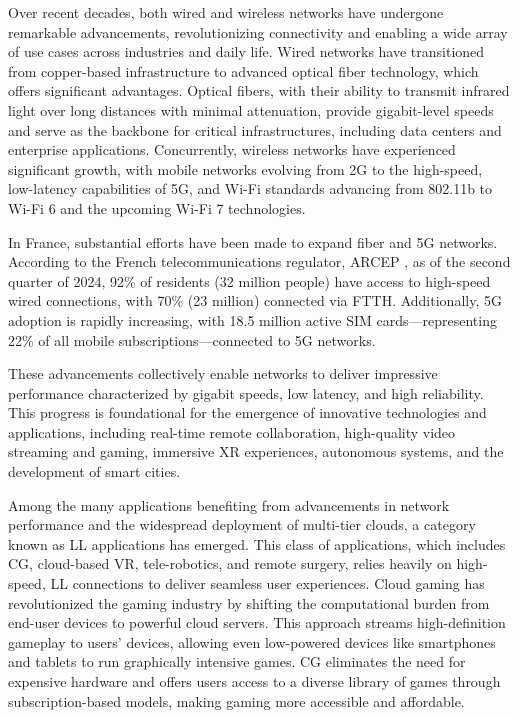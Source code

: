 Over recent decades, both wired and wireless networks have undergone remarkable advancements, revolutionizing connectivity and enabling a wide array of use cases across industries and daily life. Wired networks have transitioned from copper-based infrastructure to advanced optical fiber technology, which offers significant advantages. Optical fibers, with their ability to transmit infrared light over long distances with minimal attenuation, provide gigabit-level speeds and serve as the backbone for critical infrastructures, including data centers and enterprise applications. Concurrently, wireless networks have experienced significant growth, with mobile networks evolving from 2G to the high-speed, low-latency capabilities of 5G, and Wi-Fi standards advancing from 802.11b to Wi-Fi 6 and the upcoming Wi-Fi 7 technologies.

In France, substantial efforts have been made to expand fiber and 5G networks. According to the French telecommunications regulator, \ac{ARCEP} \cite{arcepMarchxE9Communications}, as of the second quarter of 2024, 92\% of residents (32 million people) have access to high-speed wired connections, with 70\% (23 million) connected via \ac{FTTH}. Additionally, 5G adoption is rapidly increasing, with 18.5 million active SIM cards—representing 22\% of all mobile subscriptions—connected to 5G networks.

These advancements collectively enable networks to deliver impressive performance characterized by gigabit speeds, low latency, and high reliability. This progress is foundational for the emergence of innovative technologies and applications, including real-time remote collaboration, high-quality video streaming and gaming, immersive \ac{XR} experiences, autonomous systems, and the development of smart cities.

Among the many applications benefiting from advancements in network performance and the widespread deployment of multi-tier clouds, a category known as \ac{LL} applications has emerged. This class of applications, which includes \ac{CG}, cloud-based \ac{VR}, tele-robotics, and remote surgery, relies heavily on high-speed, \ac{LL} connections to deliver seamless user experiences.
Cloud gaming has revolutionized the gaming industry by shifting the computational burden from end-user devices to powerful cloud servers. This approach streams high-definition gameplay to users' devices, allowing even low-powered devices like smartphones and tablets to run graphically intensive games. \ac{CG} eliminates the need for expensive hardware and offers users access to a diverse library of games through subscription-based models, making gaming more accessible and affordable.

